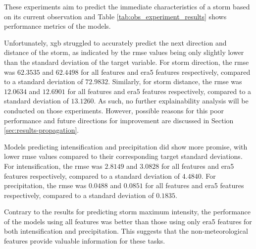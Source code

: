 These experiments aim to predict the immediate characteristics of a storm based on its current observation and Table \ref{tab:obs_experiment_results} shows performance metrics of the models. 

Unfortunately, \acrshort{xgb} struggled to accurately predict the next direction and distance of the storm, as indicated by the \acrshort{rmse} values being only slightly lower than the standard deviation of the target variable. For storm direction, the \acrshort{rmse} was $62.3535$ and $62.4498$ for all features and \acrshort{era5} features respectively, compared to a standard deviation of $72.9832$. Similarly, for storm distance, the \acrshort{rmse} was $12.0634$ and $12.6901$ for all features and \acrshort{era5} features respectively, compared to a standard deviation of $13.1260$. As such, no further explainability analysis will be conducted on those experiments. However, possible reasons for this poor performance and future directions for improvement are discussed in Section \ref{sec:results-propagation}.

Models predicting intensification and precipitation did show more promise, with lower \acrshort{rmse} values compared to their corresponding target standard deviations. For intensification, the \acrshort{rmse} was $2.8149$ and $3.0828$ for all features and \acrshort{era5} features respectively, compared to a standard deviation of $4.4840$. For precipitation, the \acrshort{rmse} was $0.0488$ and $0.0851$ for all features and \acrshort{era5} features respectively, compared to a standard deviation of $0.1835$.

Contrary to the results for predicting storm maximum intensity, the performance of the models using all features was better than those using only \acrshort{era5} features for both intensification and precipitation. This suggests that the non-meteorological features provide valuable information for these tasks.

